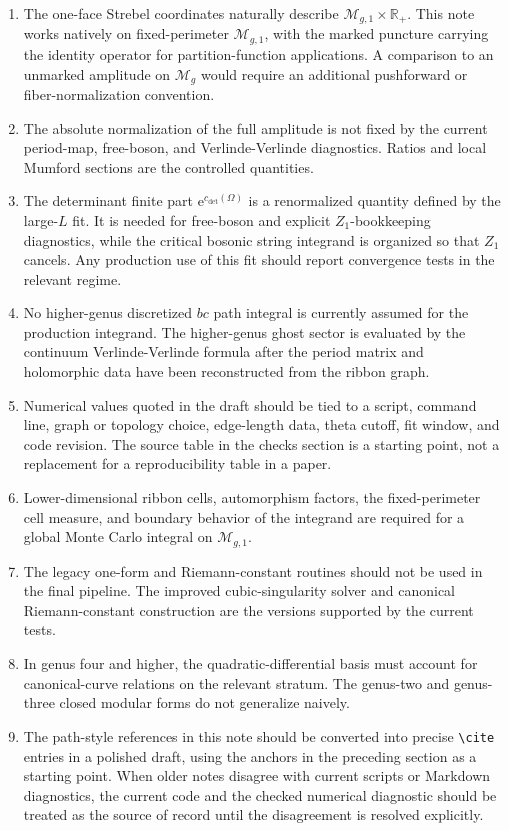 \documentclass[11pt]{article}
\numberwithin{equation}{section}
\newcommand{\bR}{\mathbb R}
\newcommand{\cM}{\mathcal M}
\newcommand{\ee}{\mathrm e}
\begin{document}
\begin{enumerate}
\item The one-face Strebel coordinates naturally describe
\(\cM_{g,1}\times\bR_+\).  This note works natively on fixed-perimeter
\(\cM_{g,1}\), with the marked puncture carrying the identity operator for
partition-function applications.  A comparison to an unmarked amplitude on
\(\cM_g\) would require an additional pushforward or fiber-normalization
convention.
\item The absolute normalization of the full amplitude is not fixed by the
current period-map, free-boson, and Verlinde-Verlinde diagnostics.  Ratios and
local Mumford sections are the controlled quantities.
\item The determinant finite part \(\ee^{c_{\det}(\Omega)}\) is a renormalized
quantity defined by the large-\(L\) fit.  It is needed for free-boson and
explicit \(Z_1\)-bookkeeping diagnostics, while the critical bosonic string
integrand is organized so that \(Z_1\) cancels.  Any production use of this fit
should report convergence tests in the relevant regime.
\item No higher-genus discretized \(bc\) path integral is currently assumed for
the production integrand.  The higher-genus ghost sector is evaluated by the
continuum Verlinde-Verlinde formula after the period matrix and holomorphic data
have been reconstructed from the ribbon graph.
\item Numerical values quoted in the draft should be tied to a script, command
line, graph or topology choice, edge-length data, theta cutoff, fit window, and
code revision.  The source table in the checks section is a starting point, not a
replacement for a reproducibility table in a paper.
\item Lower-dimensional ribbon cells, automorphism factors, the fixed-perimeter
cell measure, and boundary behavior of the integrand are required for a global
Monte Carlo integral on \(\cM_{g,1}\).
\item The legacy one-form and Riemann-constant routines should not be used in
the final pipeline.  The improved cubic-singularity solver and canonical
Riemann-constant construction are the versions supported by the current tests.
\item In genus four and higher, the quadratic-differential basis must account
for canonical-curve relations on the relevant stratum.  The genus-two and
genus-three closed modular forms do not generalize naively.
\item The path-style references in this note should be converted into precise
\verb|\cite| entries in a polished draft, using the anchors in the preceding
section as a starting point.  When older notes disagree with current scripts or
Markdown diagnostics, the current code and the checked numerical diagnostic
should be treated as the source of record until the disagreement is resolved
explicitly.
\end{enumerate}
\end{document}
